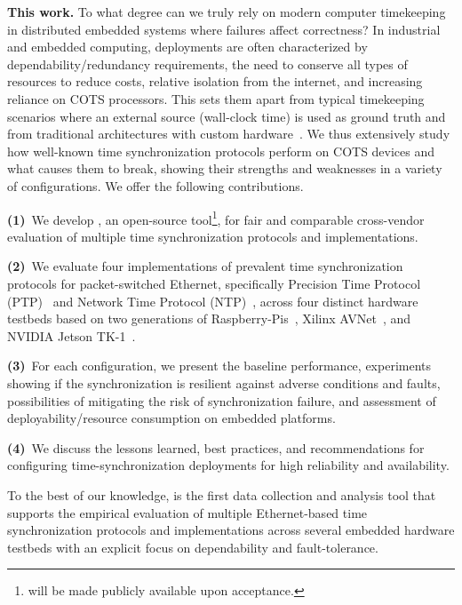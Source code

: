 \textbf{This work.}
To what degree can we truly rely on modern computer timekeeping in distributed embedded systems where failures affect correctness?
In industrial and embedded computing,
deployments are often characterized by dependability/redundancy requirements,
the need to conserve all types of resources to reduce costs,
relative isolation from the internet, %
and increasing reliance on COTS processors.
This sets them apart from typical timekeeping scenarios where an external source
(wall-clock time) is used as ground truth
and from traditional architectures with custom hardware~\cite{wensley1978sift,hopkins1978ftmp}.
We thus extensively study how well-known time synchronization protocols perform on COTS devices and what causes them to break,
showing their strengths and weaknesses in a variety of configurations.
We offer the following contributions.

\textbf{(1)}~We develop \toolName{}, an open-source tool\footnote{\toolName{} will be made publicly available upon acceptance.}, for fair and comparable cross-vendor evaluation of multiple time synchronization protocols and implementations.

\textbf{(2)}~We evaluate %
four implementations of prevalent time synchronization protocols for packet-switched Ethernet,
specifically Precision Time Protocol (PTP)~\cite{ptp-spec} and Network Time Protocol (NTP)~\cite{ntpv4-spec},
across four distinct hardware testbeds
based on two generations of Raspberry-Pis~\cite{??, ??},
Xilinx AVNet~\cite{??}, and NVIDIA Jetson TK-1~\cite{??}.

\textbf{(3)}~For each configuration,
we present the baseline performance, %
experiments showing if the synchronization is resilient against adverse
conditions and faults,
possibilities of mitigating the risk of synchronization failure,
and assessment of deployability/resource consumption on embedded platforms.

\textbf{(4)}~We discuss the lessons learned, best practices, and recommendations
for configuring time-synchronization deployments for high reliability and availability.


To the best of our knowledge, \toolName{} is the first data collection and
analysis tool %
that supports the empirical evaluation of multiple Ethernet-based time
synchronization protocols and implementations across several embedded hardware
testbeds with an explicit focus on dependability and fault-tolerance.

